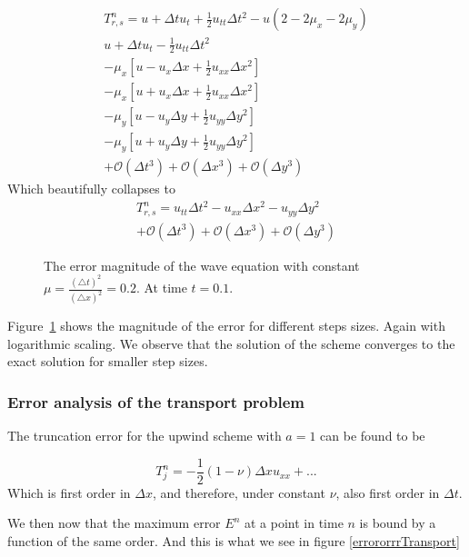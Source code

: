 \begin{align*}
T_{r,s}^n = u +  \Delta t u_t + \frac{1}{2} u_{tt} \Delta t^2 - u(2 - 2\mu_x - 2 \mu_y) \\
				u +  \Delta t u_t - \frac{1}{2} u_{tt} \Delta t^2  \\
				 - \mu_x \left[{ u - u_x \Delta x + \frac{1}{2} u_{xx} \Delta x^2 }\right]	  \\
				 - \mu_x \left[{ u + u_x \Delta x + \frac{1}{2} u_{xx} \Delta x^2 }\right]	  \\
				 - \mu_y \left[{ u - u_y \Delta y + \frac{1}{2} u_{yy} \Delta y^2 }\right]	  \\
				 - \mu_y \left[{ u + u_y \Delta y + \frac{1}{2} u_{yy} \Delta y^2 }\right]	  \\
				 + \mathcal{O}(\Delta t^3) + \mathcal{O}(\Delta x^3) + \mathcal{O}(\Delta y^3)
\end{align*}
 Which beautifully collapses to
 \begin{align*}
T_{r,s}^n = u_{tt} \Delta t ^2 - u_{xx}\Delta x ^2 - u_{yy} \Delta y^2   \\
				 + \mathcal{O}(\Delta t^3) + \mathcal{O}(\Delta x^3) + \mathcal{O}(\Delta y^3)
\end{align*}




\begin{figure}

\caption{The error magnitude of the wave equation with constant $\mu = \frac{(\triangle t)^2}{(\triangle x)^2} = 0.2$. At time $t = 0.1$.}
\label{error:Wave}
\end{figure}
Figure~\ref{error:Wave} shows the magnitude of the error for different steps sizes. Again with logarithmic scaling. We observe that the solution of the scheme converges to the exact solution for smaller step sizes.


\subsubsection{Error analysis of the transport problem}

The truncation error for the upwind scheme with $a=1$ can be found to be

\begin{equation}
T_j^n = -\frac{1}{2}(1-\nu)\Delta x u_{xx} + ...
\end{equation}
Which is first order in $\Delta x$, and therefore, under constant $\nu$, also first order in $\Delta t$.

We then now that the maximum error $E^n$ at a point in time $n$ is bound by a function of the same order. And this is what we see in figure \ref{errororrrTransport}

